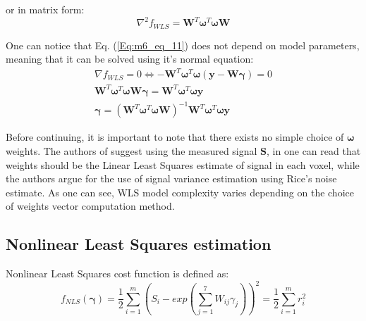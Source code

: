 or in matrix form:
\begin{equation}
\nabla^2{f_{WLS}}=\boldsymbol{W}^T\boldsymbol{\omega}^T\boldsymbol{\omega}\boldsymbol{W}
\label{Eq:m6_eq_14}
\end{equation}

One can notice that Eq. (\ref{Eq:m6_eq_11}) does not depend on model parameters, meaning that it can be solved using it's normal equation:
\begin{equation}
\begin{aligned}
\nabla{f_{WLS}}=0 \iff -\boldsymbol{W}^T\boldsymbol{\omega}^T\boldsymbol{\omega}\left(\boldsymbol{y}-\boldsymbol{W\gamma}\right)=0\\
\boldsymbol{W}^T\boldsymbol{\omega}^T\boldsymbol{\omega}\boldsymbol{W\gamma}=\boldsymbol{W}^T\boldsymbol{\omega}^T\boldsymbol{\omega}\boldsymbol{y}\\
\boldsymbol{\gamma}=\left(\boldsymbol{W}^T\boldsymbol{\omega}^T\boldsymbol{\omega}\boldsymbol{W}\right)^{-1}\boldsymbol{W}^T\boldsymbol{\omega}^T\boldsymbol{\omega y}
\end{aligned}
\label{Eq:m6_eq_15}
\end{equation}

Before continuing, it is important to note that there exists no simple choice of $\boldsymbol{\omega}$ weights. The authors of \cite{m6_koay2006a} suggest using the measured signal $\boldsymbol{S}$, in \cite{m6_salvador2005} one can read that weights should be the Linear Least Squares estimate of signal in each voxel, while the authors \cite{m6_basser1994} argue for the use of signal variance estimation using Rice's noise estimate. As one can see, WLS model complexity varies depending on the choice of weights vector computation method.

\hfill
\subsection{Nonlinear Least Squares estimation}

Nonlinear Least Squares cost function is defined as:
\begin{equation}
f_{NLS}\left(\boldsymbol{\gamma}\right)=\frac{1}{2}\sum_{i=1}^{m}\left(S_i-exp\left(\sum_{j=1}^{7}W_{ij}\gamma_j\right)\right)^2=\frac{1}{2}\sum_{i=1}^{m}r_i^2
\label{Eq:m6_eq_16}
\end{equation}

